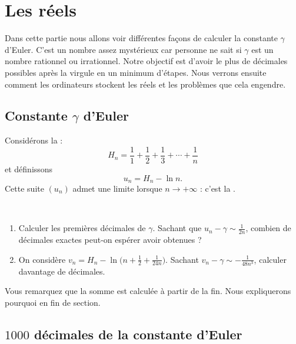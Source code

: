\documentclass[class=report,crop=false]{standalone}
\begin{document}
\section{Les réels}

Dans cette partie nous allons voir différentes façons de calculer la constante $\gamma$ d'Euler.
C'est un nombre assez mystérieux car personne ne sait si $\gamma$ est un nombre rationnel ou irrationnel.
Notre objectif est d'avoir le plus de décimales possibles après la virgule en un minimum d'étapes.
Nous verrons ensuite comment les ordinateurs stockent les réels et les problèmes que cela engendre.


\subsection{Constante $\gamma$ d'Euler}


Considérons la  :
$$H_n = \frac{1}{1}+\frac{1}{2}+\frac{1}{3}+\cdots + \frac{1}{n}$$
et définissons
$$u_n = H_n - \ln n.$$
Cette suite $(u_n)$ admet une limite lorsque $n\to+\infty$ : c'est la .


\begin{tp}~
\begin{enumerate}
  \item Calculer les premières décimales de $\gamma$. Sachant que $u_n - \gamma \sim \frac{1}{2n}$, combien de
  décimales exactes peut-on espérer avoir obtenues ?

  \item On considère $v_n = H_n -\ln\big(n+\frac 12 + \frac{1}{24n} \big)$. Sachant $v_n - \gamma \sim -\frac{1}{48n^3}$, calculer davantage
  de décimales.
\end{enumerate}
\end{tp}



 Vous remarquez que la somme est calculée à partir de la fin.
 Nous expliquerons pourquoi en fin de section.

\subsection{$1000$ décimales de la constante d'Euler}
\end{document}
